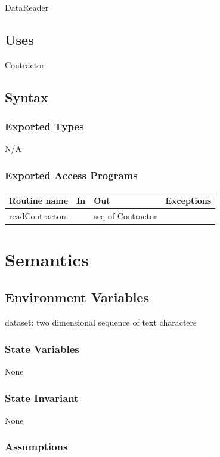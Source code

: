\documentclass[12pt]{scrartcl}
\begin{document}
DataReader

\subsection {Uses}

Contractor


\subsection {Syntax}

\subsubsection {Exported Types}

N/A

\subsubsection {Exported Access Programs}

\begin{tabular}{| l | l | l | l |}
\hline
\textbf{Routine name} & \textbf{In} & \textbf{Out} & \textbf{Exceptions}\\
\hline
readContractors & & seq of Contractor  & \\
\hline
\end{tabular}

\section {Semantics}


\subsection {Environment Variables}

dataset: two dimensional sequence of text characters

\subsubsection {State Variables}

None

\subsubsection {State Invariant}

None

\subsubsection {Assumptions}
\end{document}
